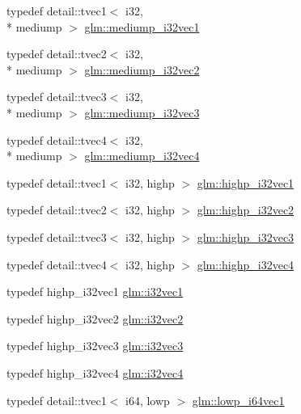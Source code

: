 \begin{DoxyCompactItemize}
\item 
typedef detail\-::tvec1$<$ i32, \\*
mediump $>$ \hyperlink{group__gtc__type__precision_ga44c6a3b78e635d91e35e1c41ab6b0ba1}{glm\-::mediump\-\_\-i32vec1}
\item 
typedef detail\-::tvec2$<$ i32, \\*
mediump $>$ \hyperlink{group__gtc__type__precision_gaef7b37956ce9e1cc4faecf21b7fdae8b}{glm\-::mediump\-\_\-i32vec2}
\item 
typedef detail\-::tvec3$<$ i32, \\*
mediump $>$ \hyperlink{group__gtc__type__precision_ga768e62b66086bd85a438341eedfad651}{glm\-::mediump\-\_\-i32vec3}
\item 
typedef detail\-::tvec4$<$ i32, \\*
mediump $>$ \hyperlink{group__gtc__type__precision_ga68126328090f37655d8218c5a5fb8ae5}{glm\-::mediump\-\_\-i32vec4}
\item 
typedef detail\-::tvec1$<$ i32, highp $>$ \hyperlink{group__gtc__type__precision_gadcd58130a48fa561e784a135a88c5d6e}{glm\-::highp\-\_\-i32vec1}
\item 
typedef detail\-::tvec2$<$ i32, highp $>$ \hyperlink{group__gtc__type__precision_ga6020d795076243085eb0d6826c849b4a}{glm\-::highp\-\_\-i32vec2}
\item 
typedef detail\-::tvec3$<$ i32, highp $>$ \hyperlink{group__gtc__type__precision_ga95de80f73e676fb6b9976ff0d33bbc4b}{glm\-::highp\-\_\-i32vec3}
\item 
typedef detail\-::tvec4$<$ i32, highp $>$ \hyperlink{group__gtc__type__precision_ga174af0fafdc5a9eb24150792bffa8b5c}{glm\-::highp\-\_\-i32vec4}
\item 
typedef highp\-\_\-i32vec1 \hyperlink{group__gtc__type__precision_ga0d3741d44591183f3dee9500b4ad9ab4}{glm\-::i32vec1}
\item 
typedef highp\-\_\-i32vec2 \hyperlink{group__gtc__type__precision_gabb9ac4a278f8a8e3a3928dc9bef81089}{glm\-::i32vec2}
\item 
typedef highp\-\_\-i32vec3 \hyperlink{group__gtc__type__precision_ga79a21b299190b6fee673087376753db0}{glm\-::i32vec3}
\item 
typedef highp\-\_\-i32vec4 \hyperlink{group__gtc__type__precision_ga5fea6ade2c848bca1fa55636e75a10b9}{glm\-::i32vec4}
\item 
typedef detail\-::tvec1$<$ i64, lowp $>$ \hyperlink{group__gtc__type__precision_gaf427ced1906a1788fdd9faab2e57c60a}{glm\-::lowp\-\_\-i64vec1}
\item 

\end{DoxyCompactItemize}
